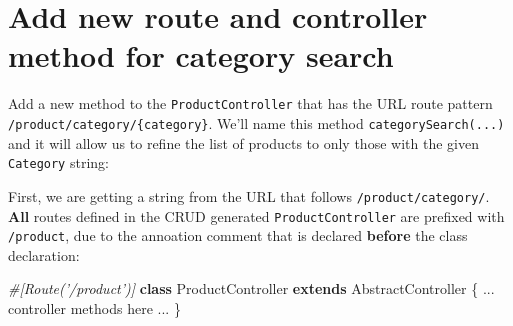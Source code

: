 \documentclass[a4paperpaper,openright]{book}
\newenvironment{Shaded}{}{}
\newcommand{\CommentTok}[1]{\textcolor[rgb]{0.38,0.63,0.69}{\textit{#1}}}
\newcommand{\KeywordTok}[1]{\textcolor[rgb]{0.00,0.44,0.13}{\textbf{#1}}}
\newcommand{\NormalTok}[1]{#1}
\newcommand{\OtherTok}[1]{\textcolor[rgb]{0.00,0.44,0.13}{#1}}
\newcommand{\StringTok}[1]{\textcolor[rgb]{0.25,0.44,0.63}{#1}}
\begin{document}
\hypertarget{add-new-route-and-controller-method-for-category-search}{%
\section{Add new route and controller method for category
search}\label{add-new-route-and-controller-method-for-category-search}}

Add a new method to the \texttt{ProductController} that has the URL
route pattern \texttt{/product/category/\{category\}}. We'll name this
method \texttt{categorySearch(...)} and it will allow us to refine the
list of products to only those with the given \texttt{Category} string:

\begin{Shaded}
\end{Shaded}

First, we are getting a string from the URL that follows
\texttt{/product/category/}. \textbf{All} routes defined in the CRUD
generated \texttt{ProductController} are prefixed with
\texttt{/product}, due to the annoation comment that is declared
\textbf{before} the class declaration:

\begin{Shaded}
\begin{Highlighting}[]
    \CommentTok{#[Route('/product')]}
    \KeywordTok{class}\NormalTok{ ProductController }\KeywordTok{extends}\NormalTok{ AbstractController}
\NormalTok{    \{}
        \StringTok{...}\NormalTok{ controller methods here }\StringTok{...}
\NormalTok{    \}}
\end{Highlighting}
\end{Shaded}
\end{document}
